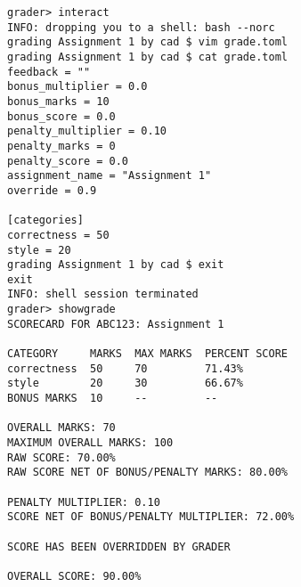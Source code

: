 \documentclass{book}
\begin{document}
\begin{verbatim}
grader> interact
INFO: dropping you to a shell: bash --norc
grading Assignment 1 by cad $ vim grade.toml
grading Assignment 1 by cad $ cat grade.toml
feedback = ""
bonus_multiplier = 0.0
bonus_marks = 10
bonus_score = 0.0
penalty_multiplier = 0.10
penalty_marks = 0
penalty_score = 0.0
assignment_name = "Assignment 1"
override = 0.9

[categories]
correctness = 50
style = 20
grading Assignment 1 by cad $ exit
exit
INFO: shell session terminated
grader> showgrade
SCORECARD FOR ABC123: Assignment 1

CATEGORY     MARKS  MAX MARKS  PERCENT SCORE
correctness  50     70         71.43%
style        20     30         66.67%
BONUS MARKS  10     --         --

OVERALL MARKS: 70
MAXIMUM OVERALL MARKS: 100
RAW SCORE: 70.00%
RAW SCORE NET OF BONUS/PENALTY MARKS: 80.00%

PENALTY MULTIPLIER: 0.10
SCORE NET OF BONUS/PENALTY MULTIPLIER: 72.00%

SCORE HAS BEEN OVERRIDDEN BY GRADER

OVERALL SCORE: 90.00%
\end{verbatim}
\end{document}
